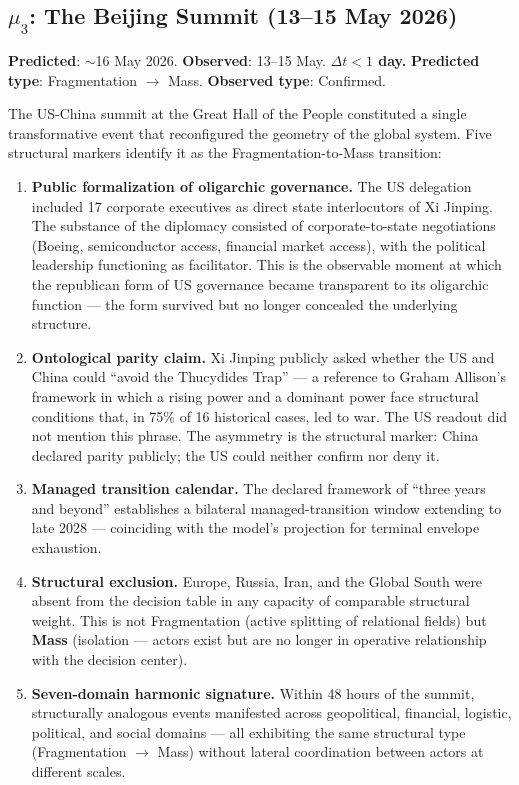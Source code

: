 \documentclass[12pt,a4paper]{article}
\begin{document}
\subsection{$\mu_3$: The Beijing Summit (13--15 May 2026)}

\textbf{Predicted}: $\sim$16 May 2026. \textbf{Observed}: 13--15 May. \textbf{$\Delta t < 1$ day.} \textbf{Predicted type}: Fragmentation $\to$ Mass. \textbf{Observed type}: Confirmed.

The US-China summit at the Great Hall of the People constituted a single transformative event that reconfigured the geometry of the global system. Five structural markers identify it as the Fragmentation-to-Mass transition:

\begin{enumerate}[leftmargin=2em]
    \item \textbf{Public formalization of oligarchic governance.} The US delegation included 17 corporate executives as direct state interlocutors of Xi Jinping. The substance of the diplomacy consisted of corporate-to-state negotiations (Boeing, semiconductor access, financial market access), with the political leadership functioning as facilitator. This is the observable moment at which the republican form of US governance became transparent to its oligarchic function --- the form survived but no longer concealed the underlying structure.
    \item \textbf{Ontological parity claim.} Xi Jinping publicly asked whether the US and China could ``avoid the Thucydides Trap'' --- a reference to Graham Allison's framework in which a rising power and a dominant power face structural conditions that, in 75\% of 16 historical cases, led to war. The US readout did not mention this phrase. The asymmetry is the structural marker: China declared parity publicly; the US could neither confirm nor deny it.
    \item \textbf{Managed transition calendar.} The declared framework of ``three years and beyond'' establishes a bilateral managed-transition window extending to late 2028 --- coinciding with the model's projection for terminal envelope exhaustion.
    \item \textbf{Structural exclusion.} Europe, Russia, Iran, and the Global South were absent from the decision table in any capacity of comparable structural weight. This is not Fragmentation (active splitting of relational fields) but \textbf{Mass} (isolation --- actors exist but are no longer in operative relationship with the decision center).
    \item \textbf{Seven-domain harmonic signature.} Within 48 hours of the summit, structurally analogous events manifested across geopolitical, financial, logistic, political, and social domains --- all exhibiting the same structural type (Fragmentation $\to$ Mass) without lateral coordination between actors at different scales.
\end{enumerate}
\end{document}

